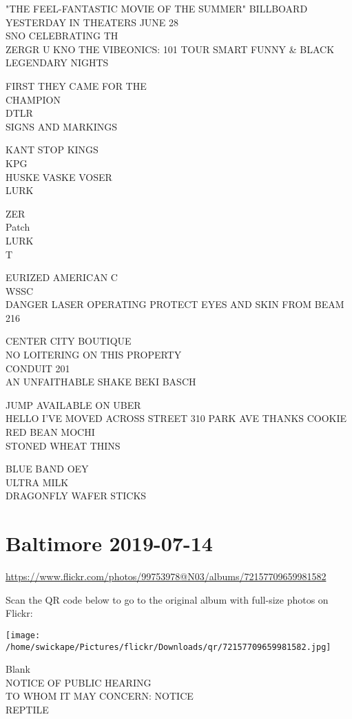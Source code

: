 \documentclass[10pt,letterpaper]{article}
\begin{document}
"THE FEEL{-}FANTASTIC MOVIE OF THE SUMMER" BILLBOARD YESTERDAY IN THEATERS JUNE 28\\
SNO CELEBRATING TH\\
ZERGR U KNO THE VIBEONICS: 101 TOUR SMART FUNNY \& BLACK\\
LEGENDARY NIGHTS

FIRST THEY CAME FOR THE\\
CHAMPION\\
DTLR\\
SIGNS AND MARKINGS

KANT STOP KINGS\\
KPG\\
HUSKE VASKE VOSER\\
LURK

ZER\\
Patch\\
LURK\\
T

EURIZED AMERICAN C\\
WSSC\\
DANGER LASER OPERATING PROTECT EYES AND SKIN FROM BEAM\\
216

CENTER CITY BOUTIQUE\\
NO LOITERING ON THIS PROPERTY\\
CONDUIT 201\\
AN UNFAITHABLE SHAKE BEKI BASCH

JUMP AVAILABLE ON UBER\\
HELLO I'VE MOVED ACROSS STREET 310 PARK AVE THANKS COOKIE\\
RED BEAN MOCHI\\
STONED WHEAT THINS

BLUE BAND OEY\\
ULTRA MILK\\
DRAGONFLY WAFER STICKS


\section*{Baltimore 2019-07-14}

\url{https://www.flickr.com/photos/99753978@N03/albums/72157709659981582}

Scan the QR code below to go to the original album with full-size photos on Flickr:

\texttt{[image: /home/swickape/Pictures/flickr/Downloads/qr/72157709659981582.jpg]}


Blank\\
NOTICE OF PUBLIC HEARING\\
TO WHOM IT MAY CONCERN: NOTICE\\
REPTILE
\end{document}
